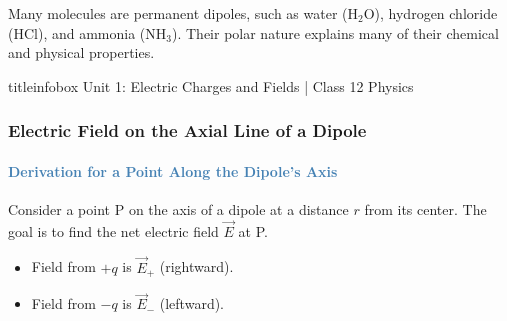 \begin{frame}
\begin{frame}
\vspace{0.3cm}

\begin{examplebox}
\vspace{0.1cm}
Many molecules are permanent dipoles, such as water (H$_2$O), hydrogen chloride (HCl), and ammonia (NH$_3$). Their polar nature explains many of their chemical and physical properties.
\vspace{0.1cm}
\end{examplebox}

\vfill

\begin{beamercolorbox}[wd=\textwidth,ht=0.5cm,dp=0.1cm,center]{titleinfobox}
    \small\color{coolgray} Unit 1: Electric Charges and Fields | Class 12 Physics
\end{beamercolorbox}
\end{frame}

\begin{frame}
\frametitle{\textsf{\textbf{Electric Field on the Axial Line of a Dipole}}}
\framesubtitle{\textcolor{steelblue}{Derivation for a Point Along the Dipole's Axis}}

\begin{keybox}
\vspace{0.1cm}
Consider a point P on the axis of a dipole at a distance $r$ from its center. The goal is to find the net electric field $\vec{E}$ at P.
\begin{itemize}
    \item Field from $+q$ is $\vec{E}_{+}$ (rightward).
    \item Field from $-q$ is $\vec{E}_{-}$ (leftward).
\end{itemize}
\vspace{0.1cm}
\end{keybox}

\vspace{0.3cm}


\end{frame}
\end{frame}
